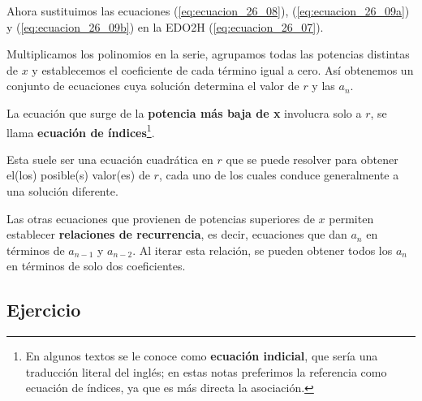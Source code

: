 Ahora sustituimos las ecuaciones (\ref{eq:ecuacion_26_08}), (\ref{eq:ecuacion_26_09a}) y (\ref{eq:ecuacion_26_09b}) en la EDO2H (\ref{eq:ecuacion_26_07}).
\par
Multiplicamos los polinomios en la serie, agrupamos todas las potencias distintas de $x$ y establecemos el coeficiente de cada término igual a cero. Así obtenemos un conjunto de ecuaciones cuya solución determina el valor de $r$ y las $a_{n}$.
\par
La ecuación que surge de la \textbf{potencia más baja de x} involucra solo a $r$, se llama \textbf{ecuación de índices}\footnote{En algunos textos se le conoce como \textbf{ecuación indicial}, que sería una traducción literal del inglés; en estas notas preferimos la referencia como ecuación de índices, ya que es más directa la asociación.}.
\par
Esta suele ser una ecuación cuadrática en $r$ que se puede resolver para obtener el(los) posible(s) valor(es) de $r$, cada uno de los cuales conduce generalmente a una solución diferente.
\par
Las otras ecuaciones que provienen de potencias superiores de $x$ permiten establecer \textbf{relaciones de recurrencia}, es decir, ecuaciones que dan $a_{n}$ en términos de $a_{n-1}$ y $a_{n-2}$. Al iterar esta relación, se pueden obtener todos los $a_{n}$ en términos de solo dos coeficientes.

\subsection{Ejercicio}

